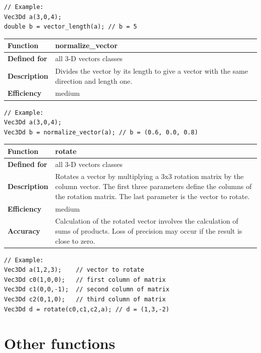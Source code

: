 \documentclass[11pt,a4paper,oneside,openright]{report}
\newcommand{\vspacesmall}{\vspace{3mm}}
\newcommand{\vspacebig}{\vspace{6mm}}
\begin{document}
\begin{lstlisting}[frame=none]
// Example:
Vec3Dd a(3,0,4);
double b = vector_length(a); // b = 5
\end{lstlisting}
\vspacebig


\begin{tabular}{|p{25mm}|p{100mm}|}
\hline
\bfseries Function & normalize\_vector \\ \hline
\bfseries Defined for & all 3-D vectors classes  \\ \hline
\bfseries Description & Divides the vector by its length to give a vector with the same direction and length one. \\ \hline
\bfseries Efficiency & medium \\ \hline
\end{tabular}
\vspacesmall

\begin{lstlisting}[frame=none]
// Example:
Vec3Dd a(3,0,4);
Vec3Dd b = normalize_vector(a); // b = (0.6, 0.0, 0.8)
\end{lstlisting}
\vspacebig


\begin{tabular}{|p{25mm}|p{100mm}|}
\hline
\bfseries Function & rotate \\ \hline
\bfseries Defined for & all 3-D vectors classes  \\ \hline
\bfseries Description & Rotates a vector by multiplying a 3x3 rotation matrix by the column vector. The first three parameters define the columns of the rotation matrix. The last parameter is the vector to rotate. \\ \hline
\bfseries Efficiency & medium \\ \hline
\bfseries Accuracy & Calculation of the rotated vector involves the calculation of sums of products. Loss of precision may occur if the result is close to zero. \\ \hline
\end{tabular}
\vspacesmall

\begin{lstlisting}[frame=none]
// Example:
Vec3Dd a(1,2,3);    // vector to rotate
Vec3Dd c0(1,0,0);   // first column of matrix
Vec3Dd c1(0,0,-1);  // second column of matrix
Vec3Dd c2(0,1,0);   // third column of matrix
Vec3Dd d = rotate(c0,c1,c2,a); // d = (1,3,-2)
\end{lstlisting}
\vspacebig



\chapter{Other functions}\label{chap:OtherFunctions}
\end{document}
